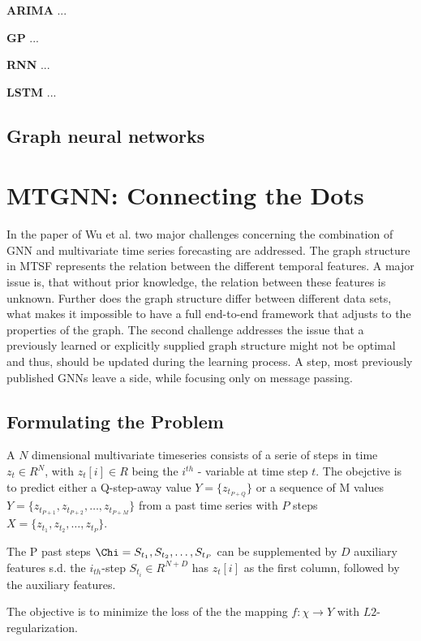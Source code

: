 \documentclass[letterpaper,twocolumn,12pt]{article}
\begin{document}
    \textbf{ARIMA} ...

    \textbf{GP} ...

    \textbf{RNN} ...

    \textbf{LSTM}  ...

    \subsection{Graph neural networks}


    \section{MTGNN: Connecting the Dots}
    In the paper of Wu et al. \cite{wu2020connecting} two major challenges concerning the combination of GNN and multivariate
    time series forecasting are addressed.
    The graph structure in MTSF represents the relation between the different temporal features.
    A major issue is, that without prior knowledge, the relation between these features is unknown.
    Further does the graph structure differ between different data sets, what makes it impossible to have a full end-to-end framework that adjusts to the properties of the graph.
    The second challenge addresses the issue that a previously learned or explicitly supplied graph structure might not be optimal and thus,
    should be updated during the learning process.
    A step, most previously published GNNs leave a side, while focusing only on message passing.

    \subsection{Formulating the Problem}
    A $N$ dimensional multivariate timeseries consists of a serie of steps in time $z_t \in R^N$, with $z_t[i] \in R$
    being the $i^{th}$ - variable at time step $t$. The obejctive is to predict either a Q-step-away value
    $Y = \{z_{t_{P+Q}}\}$ or a sequence of M values $Y = \{z_{t_{P+1}}, z_{t_{P+2}},\dots,z_{t_{P+M}}\}$
    from a past time series with $P$ steps $X = \{z_{t_{1}}, z_{t_{2}},\dots,z_{t_{P}}\}$.

    The P past steps  $\Chi = {S_{t_1}, S_{t_2}, \dots, S_{t_P}}$ can be supplemented by $D$ auxiliary features s.d. the $i_{th}$-step
    $S_{t_i} \in R^{N+D}$ has $z_t[i]$ as the first column, followed by the auxiliary features.

    The objective is to minimize the loss of the the mapping $f: \chi \rightarrow Y$ with $L2$-regularization.
\end{document}
